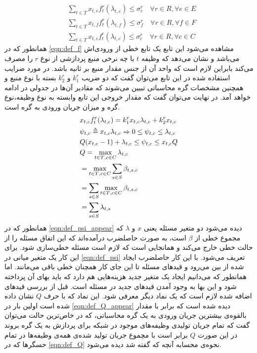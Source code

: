 	\begin{subequations}\label{eqn:constraint_load_managing}
		\begin{align}
		&\sum_{t \in T}x_{t,e}f_t^r(\lambda_{t,e}) \le \sigma_e^r \quad \forall{r \in R}, \forall{e \in E} \\
		&\sum_{t \in T}x_{t,f}f_t^r(\lambda_{t,f}) \le \sigma_f^r \quad \forall{r \in R}, \forall{f \in F} \\
		&\sum_{t \in T}x_{t,c}f_t^r(\lambda_{t,c}) \le \sigma_c^r \quad \forall{r \in R}, \forall{c \in C}
		\end{align}
	\end{subequations}
	همانطور که در \cref{eqn:def_f} مشاهده می‌شود این تابع یک تابع خطی از ورودی‌اش می‌باشد و نشان می‌دهد که وظیفه $t$ با چه نرخی منبع پردازشی از نوع $r$ را مصرف می‌کند بابراین لازم است که واحد آن از جنس مقدار منبع بر ثانیه باشد. در مورد ضرایب استفاده شده در این تابع می‌توان گفت که دو ضریب $k_1^r$ و $k_2^r$ بسته با نوع منبع و همچنین مشخصات گره محاسباتی تبیین می‌شوند که مقادیر آن‌ها در جدولی در ادامه خواهد آمد. در نهایت می‌توان گفت که مقدار خروجی این تابع وابسته به نوع وظیفه،نوع گره و میزان جریان ورودی به گره است.
	\begin{subequations}\label{eqn:def_f}
		\begin{align}
		&x_{t,c}f_t^r(\lambda_{t,c}) = k_1^rx_{t,c}\lambda_{t,c} + k_2^rx_{t,c} \label{eqn:def_psi_appear} \\
		&\psi_{t,c} \triangleq x_{t,c}\lambda_{t,c} \Rightarrow 0 \leq \psi_{t,c} \leq \lambda_{t,c} \label{eqn:def_psi} \\
		&Q(x_{t,c}-1)+\lambda_{t,c} \leq \psi_{t,c} \leq x_{t,c}Q \label{eqn:def_Q_appear}\\
		&\notag Q = \max_{{t \in T},{c \in C}} \lambda_{t,c} \\
		&\notag =\max_{{t \in T},{c \in C}} \sum_{s \in S}\beta_{t,s,c} \\
		&\notag =\sum_{s\in S} \max_{{t \in T},{c \in C}} \beta_{t,s,c} \\
		&=\sum_{s \in S}\lambda_{t,s} \label{eqn:def_Q}
		\end{align}
	\end{subequations}
	همانطور که در \cref{eqn:def_psi_appear} دیده می‌شود دو متغیر مسئله یعنی $x$ و $\lambda$ که مجموع خطی از $\beta$ است، به صورت حاصلضرب درآمده‌اند که این اتفاق مسئله را از حالت خطی خارج می‌کند و همانجایی است که لازم است مسئله خطی‌سازی شود. برای این کار یک متغیر میانی در \cref{eqn:def_psi} تعریف می‌شود. با این کار حاصلضرب ایجاد شده از بین می‌رود و قیدهای مسئله تا این جای کار همچنان خطی باقی می‌مانند. اما همانطور که می‌دانیم ایجاد یک متغیر جدید هزینه‌هایی هم دارد که باید بهای آن پرداخته شود و این بها به وجود آمدن قیدهای جدید در مسئله است. 
	قبل از بررسی قیدهای اضافه شده لازم است که یک نماد دیگر معرفی شود. این نماد که با حرف $Q$ نشان داده شده است اولین بار در \cref{eqn:def_Q_appear} دیده شده است که برابر با مقدار بالقوه‌ی بیشترین جریان ورودی به یک گره محاسباتی، که در خاص‌ترین حالت می‌توان گفت که تمام جریان تولیدی وظیفه‌های موجود در شبکه برای پردازش به یک گره بروند در این صورت $Q$ برابر است با مچموع جریان تولید شده‌ی همه‌ی وظیفه‌ها در تمام حسگرها که در \cref{eqn:def_Q} نحوه‌ی محسابه آنچه که گفته شد دیده می‌شود. 
	
